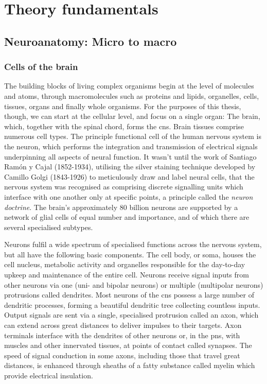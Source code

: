 
\chapter{Theory fundamentals}
\label{theory}

\section{Neuroanatomy: Micro to macro}

\subsection{Cells of the brain}

The building blocks of living complex organisms begin at the level of molecules and atoms, through macromolecules such as proteins and lipids, organelles, cells, tissues, organs and finally whole organisms.
For the purposes of this thesis, though, we can start at the cellular level, and focus on a single organ: The brain, which, together with the spinal chord, forms the \gls{cns}.
Brain tissues comprise numerous cell types.
The principle functional cell of the human nervous system is the neuron, which performs the integration and transmission of electrical signals underpinning all aspects of neural function.
It wasn't until the work of Santiago Ramón y Cajal (1852-1934), utilising the silver staining technique developed by Camillo Golgi (1843-1926) to meticulously draw and label neural cells, that the nervous system was recognised as comprising discrete signalling units which interface with one another only at specific points, a principle called the \textit{neuron doctrine}.\autocite{Kandel2021a}
The brain's approximately 80 billion neurons are supported by a network of glial cells of equal number and importance,\autocite{Herculano-Houzel2014,vonBartheld2016} and of which there are several specialised subtypes.

Neurons fulfil a wide spectrum of specialised functions across the nervous system, but all have the following basic components.
The cell body, or soma, houses the cell nucleus, metabolic activity and organelles responsible for the day-to-day upkeep and maintenance of the entire cell.
Neurons receive signal inputs from other neurons via one (uni- and bipolar neurons) or multiple (multipolar neurons) protrusions called dendrites.
Most neurons of the \gls{cns} possess a large number of dendritic processes, forming a beautiful dendritic tree collecting countless inputs.
Output signals are sent via a single, specialised protrusion called an axon, which can extend across great distances to deliver impulses to their targets.
Axon terminals interface with the dendrites of other neurons or, in the \gls{pns}, with muscles and other innervated tissues, at points of contact called synapses.
The speed of signal conduction in some axons, including those that travel great distances, is enhanced through sheaths of a fatty substance called myelin which provide electrical insulation.


